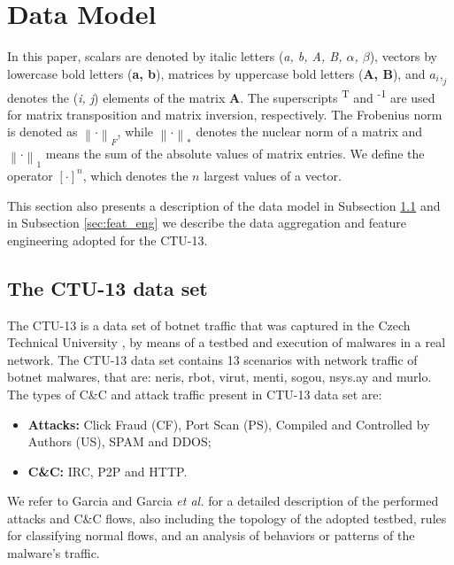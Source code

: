 \documentclass[review]{elsarticle}
\begin{document}
\section{Data Model}
\label{sec:datamodel}

In this paper, scalars are denoted by italic letters (\emph{a, b, A, B, $α$, $β$}), vectors by lowercase bold letters (\textbf{a, b}), matrices by uppercase bold letters (\textbf{A, B}), and $a_i,_j$ denotes the (\emph{i, j}) elements of the matrix \textbf{A}. The superscripts \textsuperscript{T} and \textsuperscript{-1} are used for matrix transposition and matrix inversion, respectively. The Frobenius norm is denoted as $\left\| \mathord{\cdot} \right\|_F$, while $\left\| \mathord{\cdot} \right\|_*$ denotes the nuclear norm of a matrix and $\left\| \mathord{\cdot} \right\|_1$ means the sum of the absolute values of matrix entries. We define the operator $[ \mathord{\cdot} ]^n$, which denotes the $n$ largest values of a vector.

This section also presents a description of the data model in Subsection \ref{sec:CTU-13} and in Subsection \ref{sec:feat_eng} we describe the data aggregation and feature engineering adopted for the CTU-13.

\subsection{The CTU-13 data set}
\label{sec:CTU-13}

The CTU-13 is a data set of botnet traffic that was captured in the Czech Technical University \cite{garcia2014empirical}, by means of a testbed and execution of malwares in a real network. The CTU-13 data set contains 13 scenarios with network traffic of botnet malwares, that are: neris, rbot, virut, menti, sogou, nsys.ay and murlo. The types of C\&C and attack traffic present in CTU-13 data set are:

\begin{itemize}
	\item \textbf{Attacks:} Click Fraud (CF), Port Scan (PS), Compiled and Controlled by Authors (US), SPAM and DDOS;
	\item \textbf{C\&C:} IRC, P2P and HTTP.
\end{itemize}

We refer to Garcia \cite{garcia2014identifying} and Garcia \emph{et al.} \cite{garcia2014empirical} for a detailed description of the performed attacks and C\&C flows, also including the topology of the adopted testbed, rules for classifying normal flows, and an analysis of behaviors or patterns of the malware's traffic.
\end{document}
